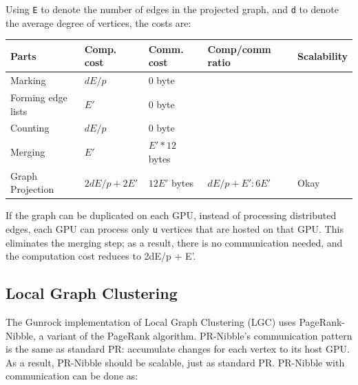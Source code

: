 \documentclass[10pt,oneside]{memoir}
\begin{document}
Using \texttt{E\textquotesingle{}} to denote the number of edges in the
projected graph, and \texttt{d} to denote the average degree of
vertices, the costs are:

\begin{longtable}[]{@{}lllll@{}}
\toprule
Parts & Comp. cost & Comm. cost & Comp/comm ratio &
Scalability\tabularnewline
\midrule
\endhead
Marking & \(dE/p\) & \(0\) byte & &\tabularnewline
Forming edge lists & \(E'\) & \(0\) byte & &\tabularnewline
Counting & \(dE/p\) & \(0\) byte & &\tabularnewline
Merging & \(E'\) & \(E' * 12\) bytes & &\tabularnewline
Graph Projection & \(2dE/p + 2E'\) & \(12E'\) bytes &
\(dE/p + E' : 6E'\) & Okay\tabularnewline
\bottomrule
\end{longtable}

If the graph can be duplicated on each GPU, instead of processing
distributed edges, each GPU can process only \texttt{u} vertices that
are hosted on that GPU. This eliminates the merging step; as a result,
there is no communication needed, and the computation cost reduces to
2dE/p + E'.

\hypertarget{local-graph-clustering}{%
\subsection{Local Graph Clustering}\label{local-graph-clustering}}

The Gunrock implementation of Local Graph Clustering (LGC) uses
PageRank-Nibble, a variant of the PageRank algorithm. PR-Nibble's
communication pattern is the same as standard PR: accumulate changes for
each vertex to its host GPU. As a result, PR-Nibble should be scalable,
just as standard PR. PR-Nibble with communication can be done as:
\end{document}
